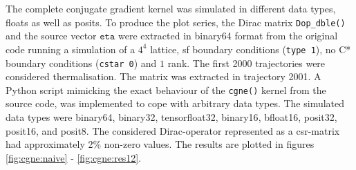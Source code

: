 \documentclass{article}
\theoremstyle{plain} %
\theoremstyle{convention} %
\theoremstyle{remark} %
\def\code#1{\texttt{#1}}
\numberwithin{equation}{section}
\begin{document}
The complete conjugate gradient kernel was simulated in different data types, floats as well as posits. To produce the plot series, the Dirac matrix \code{Dop\_dble()} and the source vector $\code{eta}$ were extracted in \gls{binary64} format from the original code running a simulation of a $4^4$ lattice, \acrfull{sf} boundary conditions (\code{type 1}), no C* boundary conditions (\code{cstar 0}) and $1$ rank. The first \num{2000} trajectories were considered thermalisation. The matrix was extracted in trajectory \num{2001}. A Python script mimicking the exact behaviour of the \code{cgne()} kernel from the source code, was implemented to cope with arbitrary data types. The simulated data types were \gls{binary64}, \gls{binary32}, \gls{tensorfloat32}, \gls{binary16}, \gls{bfloat16}, \gls{posit32}, \gls{posit16}, and \gls{posit8}. The considered Dirac-operator represented as a \acrshort{csr}-matrix had approximately \num{2}\% non-zero values. The results are plotted in figures \ref{fig:cgne:naive} - \ref{fig:cgne:res12}.
\end{document}
